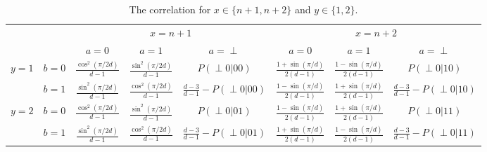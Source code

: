 \documentclass[11pt,letterpaper]{article}
\newcommand{\1}{\mathbb{1}}
\newcommand{\pr}[2]{P(#1|#2)}
\theoremstyle{definition}
\begin{document}
\begin{table}[H]
\begin{center}
\begin{tabular}{|c|c||c|c|c|c|c|c|}
\hline
\multicolumn{2}{|c|}{} &
\multicolumn{3}{|c|}{$x=n+1$}&
\multicolumn{3}{|c|}{$x=n+2$} \\
\cline{3-8}
\multicolumn{2}{|c|}{} &
$a = 0$ & $a=1$ & $a=\perp$ &
$a = 0$ & $a=1$ & $a=\perp$\\
\hline
\hline
\multirow{2}{*}{$y = 1$} & $b=0$ & $\frac{\cos^2(\pi/2d)}{d-1}$ & $\frac{\sin^2(\pi/2d)}{d-1}$ & \small $\pr{\perp0}{00}$ 
& $\frac{1+\sin(\pi/d)}{2(d-1)}$ & $\frac{1-\sin(\pi/d)}{2(d-1)}$ & \small  $\pr{\perp0}{10}$ \\
\cline{2-8}
&$b=1$ & $\frac{\sin^2(\pi/2d)}{d-1}$ & $\frac{\cos^2(\pi/2d)}{d-1}$ & $\frac{d-3}{d-1}-\pr{\perp0}{00}$ 
&  $\frac{1-\sin(\pi/d)}{2(d-1)}$ & $\frac{1+\sin(\pi/d)}{2(d-1)}$ & \small $\frac{d-3}{d-1} - \pr{\perp0}{10}$  \\
\hline
\multirow{2}{*}{$y = 2$} & $b=0$ & $\frac{\cos^2(\pi/2d)}{d-1}$ & $\frac{\sin^2(\pi/2d)}{d-1}$ & \small $\pr{\perp0}{01}$ & 
$ \frac{1-\sin(\pi/d)}{2(d-1)}$ & $ \frac{1+\sin(\pi/d)}{2(d-1)}$ & \small $\pr{\perp 0}{11}$  \\
\cline{2-8}
&$b=1$ & $\frac{\sin^2(\pi/2d)}{d-1}$ & $\frac{\cos^2(\pi/2d)}{d-1}$ & \small $\frac{d-3}{d-1}-\pr{\perp0}{01}$ &  
$ \frac{1+\sin(\pi/d)}{2(d-1)}$ & $ \frac{1-\sin(\pi/d)}{2(d-1)}$ & \small $\frac{d-3}{d-1}- \pr{\perp 0}{11}$ \\
\hline
\end{tabular}
\end{center}
\caption{The correlation for $x \in \{n+1, n+2\}$ and $y \in \{1,2\}$.}
\label{tb:chsh}
\end{table}
\end{document}
